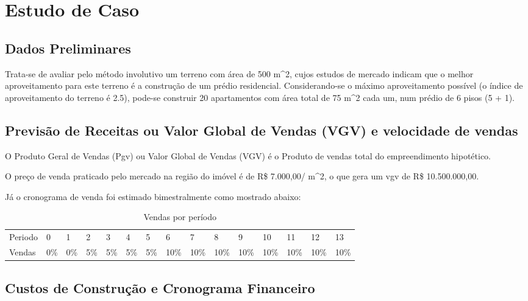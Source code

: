 \documentclass[a4paper]{article}
\begin{document}
\section{Estudo de Caso}\label{estudo-de-caso}

\subsection{Dados Preliminares}\label{dados-preliminares}

Trata-se de avaliar pelo método involutivo um terreno com área de 500
m\^{}2, cujos estudos de mercado indicam que o melhor aproveitamento
para este terreno é a construção de um prédio residencial.
Considerando-se o máximo aproveitamento possível (o índice de
aproveitamento do terreno é 2.5), pode-se construir 20 apartamentos com
área total de 75 m\^{}2 cada um, num prédio de 6 pisos (5 + 1).

\subsection{Previsão de Receitas ou Valor Global de Vendas (VGV) e
velocidade de
vendas}\label{previsao-de-receitas-ou-valor-global-de-vendas-vgv-e-velocidade-de-vendas}

O Produto Geral de Vendas (Pgv) ou Valor Global de Vendas (VGV) é o
Produto de vendas total do empreendimento hipotético.

O preço de venda praticado pelo mercado na região do imóvel é de R\$
7.000,00/ m\^{}2, o que gera um vgv de R\$ 10.500.000,00.

Já o cronograma de venda foi estimado bimestralmente como mostrado
abaixo:

\begin{table}

\caption{\label{tab:wv}Vendas por período}
\centering
\begin{tabular}[t]{lllllllllllllll}
\toprule
Periodo & 0 & 1 & 2 & 3 & 4 & 5 & 6 & 7 & 8 & 9 & 10 & 11 & 12 & 13\\
Vendas & 0\% & 0\% & 5\% & 5\% & 5\% & 5\% & 10\% & 10\% & 10\% & 10\% & 10\% & 10\% & 10\% & 10\%\\
\bottomrule
\end{tabular}
\end{table}

\subsection{Custos de Construção e Cronograma
Financeiro}\label{custos-de-construcao-e-cronograma-financeiro}
\end{document}
